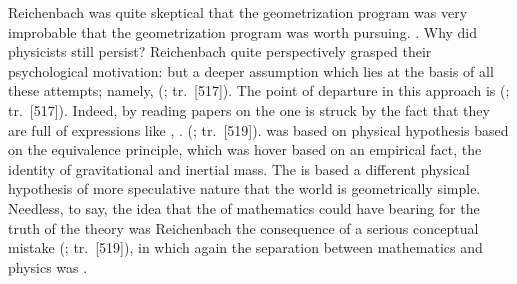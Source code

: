 \documentclass[draft]{article}
\renewcommand{\rzlap}[2]{(\cite[#1]{Reichenbach1928}; tr.\ [#2])\xspace}
\begin{document}
Reichenbach was quite skeptical that the geometrization program was very improbable that the geometrization program was worth pursuing. . Why did physicists still persist? Reichenbach quite perspectively grasped their psychological motivation:  but a deeper assumption which lies at the basis of all these attempts; namely,  \rzlap{370}{517}. The point of departure in this approach is  \rzlap{370}{517}. Indeed, by reading papers on the \uft one is struck by the fact that they are full of expressions like , \etc.  \rzlap{372}{519}. \Gr was based on physical hypothesis based on the equivalence principle, which was hover based on an empirical fact, the identity of gravitational and inertial mass. The \uftp is based a different physical hypothesis of more speculative nature that the world is geometrically simple. Needless, to say, the idea that the  of mathematics could have bearing for the truth of the theory was Reichenbach the consequence of a serious conceptual mistake \rzlap{372}{519}, in which again the separation between mathematics and physics was .


\end{document}
